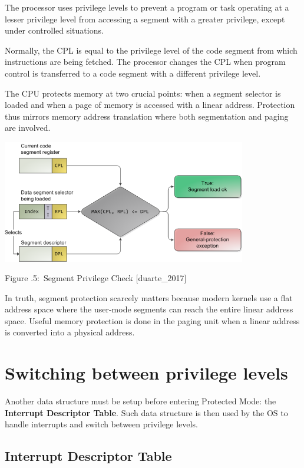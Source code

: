 \documentclass[twoside]{article}
\newcounter{lecnum}
\renewcommand{\cite}[1]{[#1]}
\newcommand{\fig}[3]{
            \vspace{#2}
            \begin{center}
            Figure \thelecnum.#1:~#3
            \end{center}
    }
\begin{document}
The processor uses privilege levels to prevent a program or task operating at a lesser privilege level from accessing a segment with a greater privilege, except under controlled situations.

Normally, the CPL is equal to the privilege level of the code segment from which instructions are being fetched. The processor changes the CPL when program control is transferred to a code segment with a different privilege level.

The CPU protects memory at two crucial points: when a segment selector is loaded and when a page of memory is accessed with a linear address. Protection thus mirrors memory address translation where both segmentation and paging are involved.

\begin{center}
  \includegraphics[width=0.8\textwidth]{segproc.png}
  \fig{5}{0 pt}{Segment Privilege Check \cite{duarte_2017}}
\end{center}

In truth, segment protection scarcely matters because modern kernels use a flat address space where the user-mode segments can reach the entire linear address space. Useful memory protection is done in the paging unit when a linear address is converted into a physical address.

\section{Switching between privilege levels}

Another data structure must be setup before entering Protected Mode: the \textbf{Interrupt Descriptor Table}. Such data structure is then used by the OS to handle interrupts and switch between privilege levels.

\subsection{Interrupt Descriptor Table}
\end{document}
